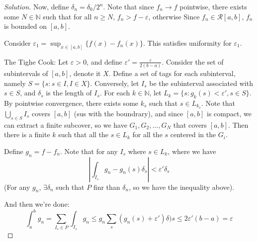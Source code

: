 \documentclass{article}
\newcommand{\N}{{\mathbb N}}
\newcommand{\ep}{{\varepsilon}}
\theoremstyle{remark}
\begin{document}
\begin{proof}[Solution]
	Now, define $\delta_n = \delta_0/2^n$.
	Note that since $f_n \to f$ pointwise,
	there exists some $N \in \N$ such that for all $n \geq N$,
	$f_n > f - \ep$,
	otherwise
	Since $f_n \in \mathcal{R}[a,b]$, $f_n$ is bounded on $[a,b]$.

	Consider $\ep_1 = \sup_{x\in[a,b]}\{f(x) - f_n(x)\}$.
	This satisfies uniformity for $\ep_1$.

	
	The Tighe Cook:
	Let $\ep > 0$, and define $\ep' = \frac{\ep}{2(b-a)}$.
	Consider the set of subintervals of $[a,b]$, denote it $X$.
	Define a set of tags for each subinterval,
	namely $S = \{s \colon s \in I, I \in X\}$.
	Conversely, let $I_s$ be the subinterval associated with $s\in S$,
	and $\delta_s$ is the length of $I_s$.
	For each $k \in \N$, let $L_k = \{s \colon g_k(s) < \ep', s \in S\}$.
	By pointwise convergence, there exists some $k_s$
	such that $s \in L_{k_s}$.
	Note that $\bigcup_{s \in S}I_s$ covers $[a,b]$ (sus with the boundrary),
	and since $[a,b]$ is compact, we can extract a finite subcover,
	so we have $G_1, G_2, \dots, G_N$ that covers $[a,b]$.
	Then there is a finite $k$ such that all the $s \in L_k$
	for all the $s$ centered in the $G_i$.

	Define $g_n = f - f_n$.
	Note that for any $I_s$ where $s \in L_k$,
	where we have
	\[
		\left\lvert \int_{I_s} g_n - g_n(s)\delta_s \right\rvert < \ep' \delta_s
	\]
	(For any $g_n$, $\exists \delta_n$ such that $P$ finr than $\delta_n$,
	so we have the inequality above).

	And then we're done:
	\[
		\int_a^bg_n = \sum_{I_s \in P}\int_{I_s} g_n \leq g_n\sum_{s} (g_n(s) + \ep')\delta)s \leq 2\ep'(b-a) = \ep
	\]
\end{proof}
\end{document}
